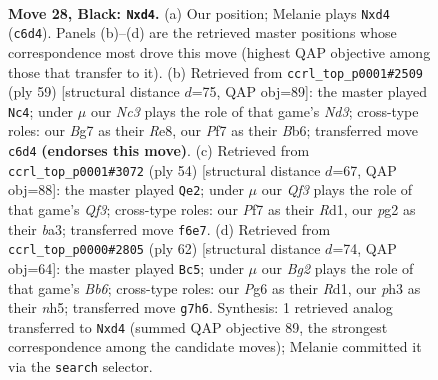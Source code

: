\documentclass[11pt]{article}
\begin{document}
\clearpage

\begin{figure}[p]\centering
\begin{subfigure}{0.46\textwidth}\centering
\resizebox{\linewidth}{!}{%
\newchessgame
\chessboard[
  setfen={r5k1/1p3pb1/1nn2qp1/p2p4/3P3p/1B2Q2P/PP3PPB/RN4K1 b - - 1 28},
  showmover=false,
  pgfstyle=straightmove, color=movearrow, markmove={c6-d4}
]}
\caption{}
\end{subfigure}\hfill
\begin{subfigure}{0.46\textwidth}\centering
\resizebox{\linewidth}{!}{%
\newchessgame
\chessboard[
  setfen={4r1k1/5pp1/1bqn3p/1p2p3/1P1pP1Q1/3B3P/2PB1PP1/R5K1 b - - 7 30},
  showmover=false,
  pgfstyle=straightmove, color=movearrow, markmove={d6-c4}
]}
\caption{}
\end{subfigure}
\\[4pt]
\begin{subfigure}{0.46\textwidth}\centering
\resizebox{\linewidth}{!}{%
\newchessgame
\chessboard[
  setfen={8/1p1b1pk1/p2q2p1/2rp3p/3N4/bP2PQPP/P4PB1/3R2K1 w - - 0 28},
  showmover=false,
  pgfstyle=straightmove, color=movearrow, markmove={f3-e2}
]}
\caption{}
\end{subfigure}\hfill
\begin{subfigure}{0.46\textwidth}\centering
\resizebox{\linewidth}{!}{%
\newchessgame
\chessboard[
  setfen={b3r1k1/4qp1p/pB1b2p1/1p1P1pPn/8/PNN5/1PP2Q1P/1K1R4 w - - 3 32},
  showmover=false,
  pgfstyle=straightmove, color=movearrow, markmove={b6-c5}
]}
\caption{}
\end{subfigure}
\caption{\textbf{Move 28, Black: \texttt{Nxd4}.} (a) Our position; Melanie plays \texttt{Nxd4} (\texttt{c6d4}). Panels (b)--(d) are the retrieved master positions whose correspondence most drove this move (highest QAP objective among those that transfer to it). (b) Retrieved from \texttt{ccrl\_top\_p0001\#2509} (ply 59) [structural distance $d$=75, QAP obj=89]: the master played \texttt{Nc4}; under $\mu$ our \emph{Nc3} plays the role of that game's \emph{Nd3}; cross-type roles: our \emph{B}g7 as their \emph{R}e8, our \emph{P}f7 as their \emph{B}b6; transferred move \texttt{c6d4} \textbf{(endorses this move)}. (c) Retrieved from \texttt{ccrl\_top\_p0001\#3072} (ply 54) [structural distance $d$=67, QAP obj=88]: the master played \texttt{Qe2}; under $\mu$ our \emph{Qf3} plays the role of that game's \emph{Qf3}; cross-type roles: our \emph{P}f7 as their \emph{R}d1, our \emph{p}g2 as their \emph{b}a3; transferred move \texttt{f6e7}. (d) Retrieved from \texttt{ccrl\_top\_p0000\#2805} (ply 62) [structural distance $d$=74, QAP obj=64]: the master played \texttt{Bc5}; under $\mu$ our \emph{Bg2} plays the role of that game's \emph{Bb6}; cross-type roles: our \emph{P}g6 as their \emph{R}d1, our \emph{p}h3 as their \emph{n}h5; transferred move \texttt{g7h6}. Synthesis: 1 retrieved analog transferred to \texttt{Nxd4} (summed QAP objective 89, the strongest correspondence among the candidate moves); Melanie committed it via the \texttt{search} selector.}
\label{fig:thought-m55}
\end{figure}
\end{document}
